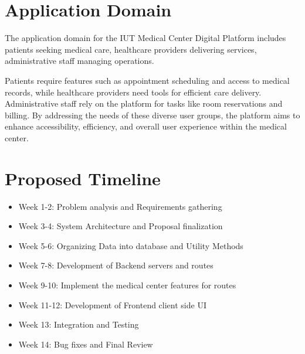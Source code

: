 \documentclass[11.5pt]{article}
\begin{document}
	
	
	\section{Application Domain}
	
	The application domain for the IUT Medical Center Digital Platform includes patients seeking medical care, healthcare providers delivering services, administrative staff managing operations. \newline
	
	Patients require features such as appointment scheduling and access to medical records, while healthcare providers need tools for efficient care delivery. Administrative staff rely on the platform for tasks like room reservations and billing. By addressing the needs of these diverse user groups, the platform aims to enhance accessibility, efficiency, and overall user experience within the medical center.
	
	
	
	
	\section{Proposed Timeline}
	\begin{itemize}
		\item Week 1-2: Problem analysis and Requirements gathering
		\item Week 3-4: System Architecture and Proposal finalization
		\item Week 5-6: Organizing Data into database and Utility Methods
		\item Week 7-8: Development of Backend servers and routes
		\item Week 9-10: Implement the medical center features for routes
		\item Week 11-12: Development of Frontend client side UI
		\item Week 13: Integration and Testing
		\item Week 14: Bug fixes and Final Review
	\end{itemize}
	
	
	
\end{document}
